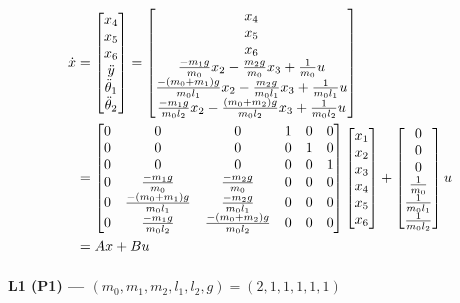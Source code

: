 \documentclass[12pt,a4paper]{article}
\begin{document}
\begin{align*}
	\dot x &=  \begin{bmatrix}
		x_4 \\ x_5 \\ x_6 \\ \ddot y \\ \ddot \theta_1 \\ \ddot \theta_2
	\end{bmatrix} = \begin{bmatrix}
	x_4 \\ x_5 \\ x_6 \\
	{-m_1g\over m_0}x_2 - {m_2g\over m_0}x_3 + {1\over m_0}u \\
	{-(m_0 + m_1)g \over m_0l_1}x_2- {m_2g \over m_0l_1}x_3 + {1\over m_0l_1}u \\
	{-m_1g\over m_0l_2}x_2 - {(m_0 + m_2)g\over m_0l_2}x_3 + {1\over m_0l_2}u
	\end{bmatrix}  \\ 
	&= \begin{bmatrix}
		0 & 0 & 0 & 1 & 0 & 0 \\
		0 & 0 & 0 & 0 & 1 & 0 \\
		0 & 0 & 0 & 0 & 0 & 1 \\
		0 & {-m_1g\over m_0} & {-m_2g\over m_0} & 0 & 0 & 0 \\
		0 & {-(m_0 + m_1)g \over m_0l_1} & {-m_2g\over m_0l_1} & 0 & 0 &0\\
		0 & {-m_1g\over m_0 l_2} & {-(m_0 + m_2)g\over m_0l_2} & 0 & 0 & 0
	\end{bmatrix} \begin{bmatrix}
	x_1 \\ x_2 \\ x_3 \\ x_4 \\ x_5 \\ x_6
	\end{bmatrix} + \begin{bmatrix}
	0 \\ 0 \\ 0 \\ {1\over m_0} \\ {1\over m_0l_1} \\ {1\over m_0l_2}
	\end{bmatrix}u \\
	&= Ax + Bu
\end{align*}

\Needspace{2cm}
\paragraph*{L1 (P1) --- $(m_0,m_1,m_2,l_1,l_2,g)=(2,1,1,1,1,1)$}
\end{document}
